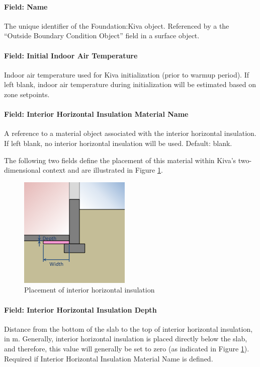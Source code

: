 \paragraph{Field: Name}

The unique identifier of the Foundation:Kiva object. Referenced by a the
``Outside Boundary Condition Object'' field in a surface object.

\paragraph{Field: Initial Indoor Air Temperature}

Indoor air temperature used for Kiva initialization (prior to warmup period).
If left blank, indoor air temperature during initialization will be estimated based on zone setpoints.

\paragraph{Field: Interior Horizontal Insulation Material
Name}

A reference to a material object associated with the interior horizontal
insulation. If left blank, no interior horizontal insulation will be
used. Default: blank.

The following two fields define the placement of this material within
Kiva's two-dimensional context and are illustrated in Figure
\ref{fig:ihi}.

\begin{figure}
\centering
\includegraphics{media/kiva-2d-ihi.png}
\caption{Placement of interior horizontal insulation\label{fig:ihi}}
\end{figure}

\paragraph{Field: Interior Horizontal Insulation
Depth}

Distance from the bottom of the slab to the top of interior horizontal insulation,
in m. Generally, interior horizontal insulation is placed directly below the slab, and therefore, this value will generally be set to zero (as indicated in Figure \ref{fig:ihi}).
Required if Interior Horizontal Insulation Material Name is
defined.

